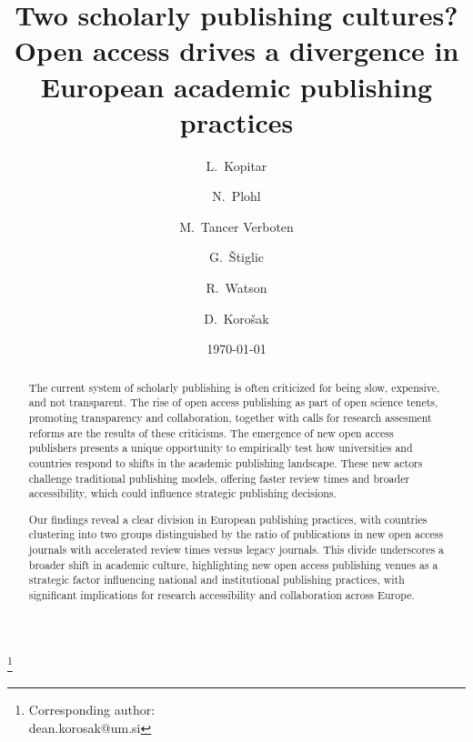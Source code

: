 \documentclass[amsfonts, amssymb, prl, superscriptaddress, notitlepage, twocolumn, nofootinbib]{revtex4-2}
\begin{document}
\title{Two scholarly publishing cultures? Open access drives a divergence in European academic publishing practices}
\author{L.~Kopitar }

\author{N.~Plohl}

\author{M.~Tancer Verboten}


\author{G.~Štiglic }

\author{R.~Watson }

\author{D.~Korošak  }
\thanks{Corresponding author:\\dean.korosak@um.si}




\date{\today}

\begin{abstract}
The current system of scholarly publishing is often criticized for being slow, expensive, and not transparent. The rise of open access publishing as part of open science tenets, promoting transparency and collaboration, together with calls for research assesment reforms are the results of these criticisms. The emergence of new open access publishers presents a unique opportunity to empirically test how universities and countries respond to shifts in the academic publishing landscape. These new actors challenge traditional publishing models, offering faster review times and broader accessibility, which could influence strategic publishing decisions.

Our findings reveal a clear division in European publishing practices, with countries clustering into two groups distinguished by the ratio of publications in new open access journals with accelerated review times versus legacy journals. This divide underscores a broader shift in academic culture, highlighting new open access publishing venues as a strategic factor influencing national and institutional publishing practices, with significant implications for research accessibility and collaboration across Europe.
\end{abstract}
\end{document}
